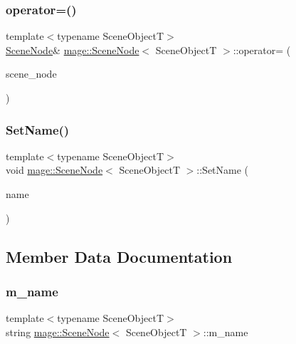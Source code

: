 \subsubsection{\texorpdfstring{operator=()}{operator=()}\hspace{0.1cm}{\footnotesize\ttfamily [2/2]}}
{\footnotesize\ttfamily template$<$typename Scene\+ObjectT$>$ \\
\hyperlink{classmage_1_1_scene_node}{Scene\+Node}\& \hyperlink{classmage_1_1_scene_node}{mage\+::\+Scene\+Node}$<$ Scene\+ObjectT $>$\+::operator= (\begin{DoxyParamCaption}\item[{\hyperlink{classmage_1_1_scene_node}{Scene\+Node}$<$ Scene\+ObjectT $>$ \&\&}]{scene\+\_\+node }\end{DoxyParamCaption})\hspace{0.3cm}{\ttfamily [delete]}}

\hypertarget{classmage_1_1_scene_node_a9b77104eb1122ebb75fb5bba537bc967}{}\label{classmage_1_1_scene_node_a9b77104eb1122ebb75fb5bba537bc967} 
\subsubsection{\texorpdfstring{Set\+Name()}{SetName()}}
{\footnotesize\ttfamily template$<$typename Scene\+ObjectT$>$ \\
void \hyperlink{classmage_1_1_scene_node}{mage\+::\+Scene\+Node}$<$ Scene\+ObjectT $>$\+::Set\+Name (\begin{DoxyParamCaption}\item[{const string \&}]{name }\end{DoxyParamCaption})}



\subsection{Member Data Documentation}
\hypertarget{classmage_1_1_scene_node_a210a40aa88e7c21d4b506ff78581eb2f}{}\label{classmage_1_1_scene_node_a210a40aa88e7c21d4b506ff78581eb2f} 
\subsubsection{\texorpdfstring{m\+\_\+name}{m\_name}}
{\footnotesize\ttfamily template$<$typename Scene\+ObjectT$>$ \\
string \hyperlink{classmage_1_1_scene_node}{mage\+::\+Scene\+Node}$<$ Scene\+ObjectT $>$\+::m\+\_\+name\hspace{0.3cm}{\ttfamily [private]}}

